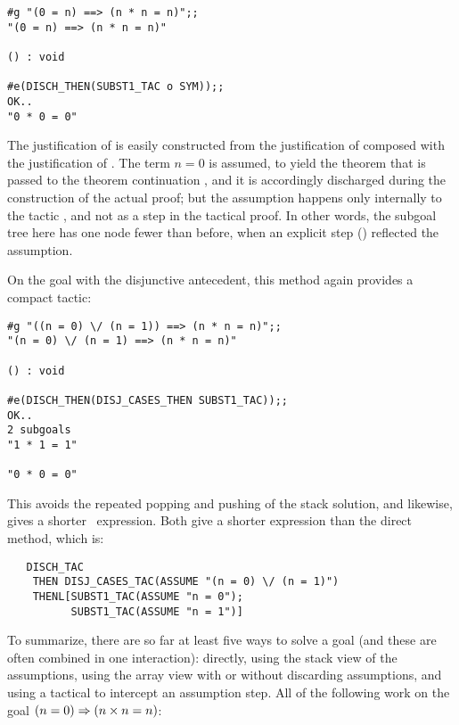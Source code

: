 {\setcounter{sessioncount}{1}
\begin{session}\begin{verbatim}
#g "(0 = n) ==> (n * n = n)";;
"(0 = n) ==> (n * n = n)"

() : void

#e(DISCH_THEN(SUBST1_TAC o SYM));;
OK..
"0 * 0 = 0"
\end{verbatim}\end{session}

The justification of  is easily constructed
from the justification of  composed with the justification of
. 
The term $n=0$ is assumed, to yield the
theorem that is passed to the theorem continuation ,
and it is accordingly discharged during the construction of the
actual proof; but the assumption happens
only internally
 to the tactic , and not
as a step in the tactical proof.  In other words, the subgoal tree here
has one node fewer than before, when an explicit step () 
reflected the assumption.

On the goal with the disjunctive antecedent, this method again
provides a compact tactic:

\setcounter{sessioncount}{1}
\begin{session}\begin{verbatim}
#g "((n = 0) \/ (n = 1)) ==> (n * n = n)";;
"(n = 0) \/ (n = 1) ==> (n * n = n)"

() : void

#e(DISCH_THEN(DISJ_CASES_THEN SUBST1_TAC));;
OK..
2 subgoals
"1 * 1 = 1"

"0 * 0 = 0"
\end{verbatim}\end{session}

\noindent This avoids the repeated popping and pushing of the stack
solution, and likewise, gives a shorter \ML\ expression. Both give
a shorter expression than the direct method, which is:

\begin{hol}\begin{verbatim}
   DISCH_TAC 
    THEN DISJ_CASES_TAC(ASSUME "(n = 0) \/ (n = 1)") 
    THENL[SUBST1_TAC(ASSUME "n = 0");
          SUBST1_TAC(ASSUME "n = 1")]
\end{verbatim}\end{hol}

To summarize, there are so far at least five ways to solve a goal
(and these are often combined in one interaction):
directly, using the stack view of the assumptions,
using the array view with or without discarding assumptions, and using a
tactical to intercept an assumption step.  All of the following work
on the goal $(n=0) \Rightarrow (n \times n = n)$:

}
